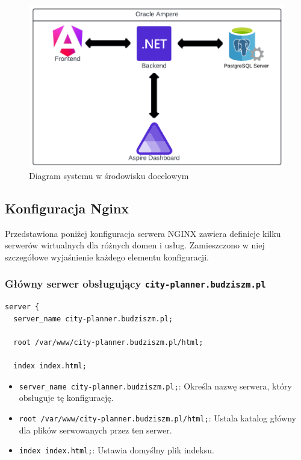 \begin{figure}[H]
    \centering
    \includegraphics[width=1\textwidth]{attachments/arch-diag}
    \caption{Diagram systemu w środowisku docelowym}
    \label{fig:figure}
\end{figure}

\pagebreak
\subsection{Konfiguracja Nginx}
\label{subsec:konfiguracja-nginx}
Przedstawiona poniżej konfiguracja serwera NGINX zawiera definicje kilku serwerów wirtualnych dla różnych domen i usług.
Zamieszczono w niej szczegółowe wyjaśnienie każdego elementu konfiguracji.

\subsubsection{Główny serwer obsługujący \texttt{city-planner.budziszm.pl}}
\begin{lstlisting}[label={lst:n1}]
server {
  server_name city-planner.budziszm.pl;

  root /var/www/city-planner.budziszm.pl/html;

  index index.html;
\end{lstlisting}
\begin{itemize}
    \item \texttt{server\_name city-planner.budziszm.pl;}: Określa nazwę serwera, który obsługuje tę konfigurację.
    \item \texttt{root /var/www/city-planner.budziszm.pl/html;}: Ustala katalog główny dla plików serwowanych przez ten serwer.
    \item \texttt{index index.html;}: Ustawia domyślny plik indeksu.
\end{itemize}

